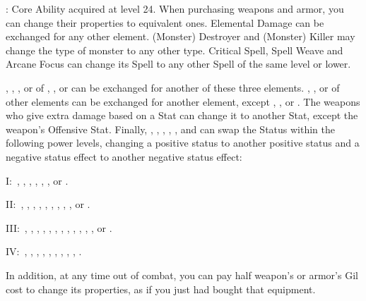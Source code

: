 \begin{ffminipage}
\noindent{}: Core Ability acquired at level 24. When purchasing weapons and armor, you can change their properties to equivalent ones. Elemental Damage can be exchanged for any other element. (Monster) Destroyer and (Monster) Killer may change the type of monster to any other type. Critical Spell, Spell Weave and Arcane Focus can change its Spell to any other Spell of the same level or lower. \pc%

, , , or  of , , or  can be exchanged for another of these three elements. , ,  or  of other elements can be exchanged for another element, except , , or . The weapons who give extra damage based on a Stat can change it to another Stat, except the weapon’s Offensive Stat. Finally, , , , , , and  can swap the Status within the following power levels, changing a positive status to another positive status and a negative status effect to another negative status effect:

I:\@{}\ , , , , , , or .

II:\@{}\ , , , , , , , , , or .

III:\@{}\ , , , , , , , , , , , , or .

IV:\@{}\ , , , , , , , , , . \pc%

In addition, at any time out of combat, you can pay half weapon’s or armor’s Gil cost to change its properties, as if you just had bought that equipment. \pc%


\end{ffminipage}
